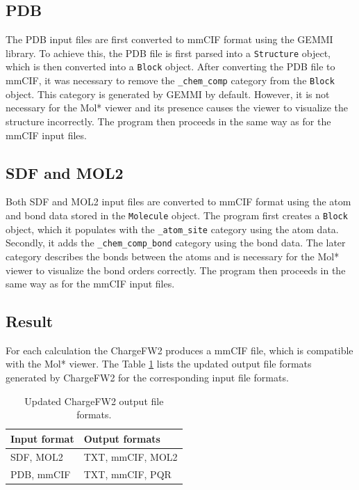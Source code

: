 \documentclass[
  digital,     %
  oneside,     %
  nosansbold,  %
  nocolorbold, %
  lof,         %
  lot,         %
]{fithesis4}
\begin{document}
\subsection{PDB}

The PDB input files are first converted to mmCIF format using the GEMMI library. To achieve this, the PDB file is first parsed into a \texttt{Structure} object, which is then converted into a \texttt{Block} object. After converting the PDB file to mmCIF, it was necessary to remove the \texttt{\_chem\_comp} category from the \texttt{Block} object. This category is generated by GEMMI by default. However, it is not necessary for the Mol* viewer and its presence causes the viewer to visualize the structure incorrectly. The program then proceeds in the same way as for the mmCIF input files.

\subsection{SDF and MOL2}

Both SDF and MOL2 input files are converted to mmCIF format using the atom and bond data stored in the \texttt{Molecule} object. The program first creates a \texttt{Block} object, which it populates with the \texttt{\_atom\_site} category using the atom data. Secondly, it adds the \texttt{\_chem\_comp\_bond} category using the bond data. The later category describes the bonds between the atoms and is necessary for the Mol* viewer to visualize the bond orders correctly. The program then proceeds in the same way as for the mmCIF input files.

\subsection*{Result}

For each calculation the ChargeFW2 produces a mmCIF file, which is compatible with the Mol* viewer. The Table \ref{table:new_chargefw2_output_formats} lists the updated output file formats generated by ChargeFW2 for the corresponding input file formats.

\begin{table}[htbp]
  \centering
  \begin{tabular}{|l|l|}
    \hline
    \textbf{Input format} & \textbf{Output formats} \\
    \hline
    SDF, MOL2 & TXT, mmCIF, MOL2 \\
    \hline
    PDB, mmCIF & TXT, mmCIF, PQR \\
    \hline
  \end{tabular}
  \caption{Updated ChargeFW2 output file formats.}
  \label{table:new_chargefw2_output_formats}
\end{table}
\end{document}
